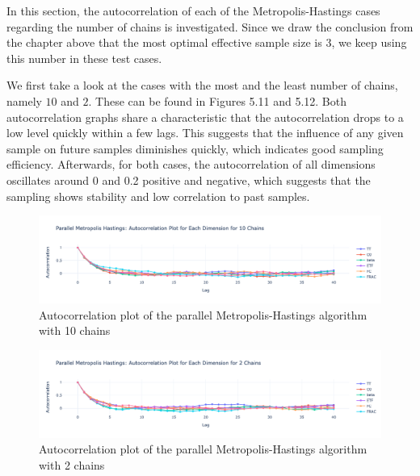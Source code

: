 In this section, the autocorrelation of each of the Metropolis-Hastings cases regarding the number of chains is investigated. Since we draw the conclusion from the chapter above that the most optimal effective sample size is $3$, we keep using this number in these test cases.

We first take a look at the cases with the most and the least number of chains, namely $10$ and $2$. These can be found in Figures 5.11 and 5.12. Both autocorrelation graphs share a characteristic that the autocorrelation drops to a low level quickly within a few lags. This suggests that the influence of any given sample on future samples diminishes quickly, which indicates good sampling efficiency. Afterwards, for both cases, the autocorrelation of all dimensions oscillates around 0 and 0.2 positive and negative, which suggests that the sampling shows stability and low correlation to past samples. 

\begin{figure}[H]
    \centering
    \includegraphics[width=1\textwidth]{figures/parallel_mh/Autocorrelation_10.png}
    \captionsetup{width=.8\textwidth}
    \caption{Autocorrelation plot of the parallel Metropolis-Hastings algorithm with 10 chains}
    \label{fig:enter-label}
\end{figure}


\begin{figure}[H]
    \centering
    \includegraphics[width=1\textwidth]{figures/parallel_mh/Autocorrelation_2.png}
    \captionsetup{width=.8\textwidth}
    \caption{Autocorrelation plot of the parallel Metropolis-Hastings algorithm with 2 chains}
    \label{fig:enter-label}
\end{figure}


